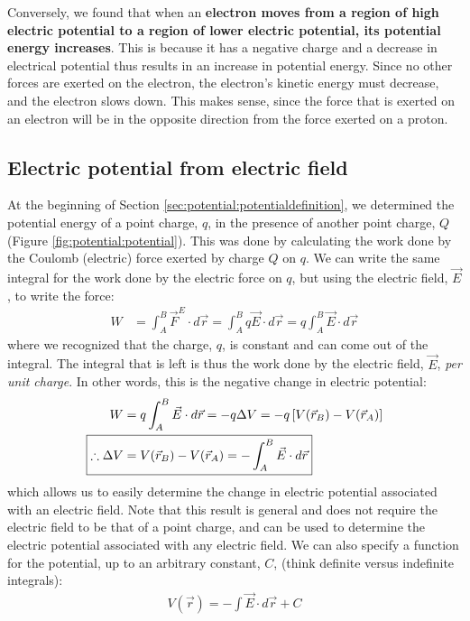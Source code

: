 \begin{example}
Conversely, we found that when an \textbf{electron moves from a region of high electric potential to a region of lower electric potential, its potential energy increases}. This is because it has a negative charge and a decrease in electrical potential thus results in an increase in potential energy. Since no other forces are exerted on the electron, the electron's kinetic energy must decrease, and the electron slows down. This makes sense, since the force that is exerted on an electron will be in the opposite direction from the force exerted on a proton. 
\end{example}

\subsection{Electric potential from electric field}
At the beginning of Section \ref{sec:potential:potentialdefinition}, we determined the potential energy of a point charge, $q$, in the presence of another point charge, $Q$ (Figure \ref{fig:potential:potential}). This was done by calculating the work done by the Coulomb (electric) force exerted by charge $Q$ on $q$. We can write the same integral for the work done by the electric force on $q$, but using the electric field, $\vec E$, to write the force:
\begin{align*}
W&=\int_A^B \vec F^E\cdot d\vec r=\int_A^B q \vec E\cdot d\vec r=q \int_A^B  \vec E\cdot d\vec r
\end{align*}
where we recognized that the charge, $q$, is constant and can come out of the integral. The integral that is left is thus the work done by the electric field, $\vec E$, \textit{per unit charge}. In other words, this is the negative change in electric potential:
\begin{align*}
W&=q \int_A^B  \vec E\cdot d\vec r=-q\Delta V = -q\left[ V(\vec r_B)-V(\vec r_A) \right]\\
\Aboxed{\therefore \Delta V &=V(\vec r_B)-V(\vec r_A)=-\int_A^B  \vec E\cdot d\vec r}
\end{align*}
which allows us to easily determine the change in electric potential associated with an electric field. Note that this result is general and does not require the electric field to be that of a point charge, and can be used to determine the electric potential associated with any electric field. We can also specify a function for the potential, up to an arbitrary constant, $C$, (think definite versus indefinite integrals):
\begin{align*}
V(\vec r)=-\int \vec E\cdot d\vec r + C
\end{align*}

